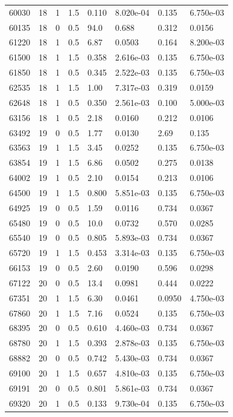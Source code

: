 \documentclass[preview]{standalone}
\begin{document}
{{{{{\begin{tabular}{L{1.2cm}C{1.2cm} C{0.3cm}C{0.5cm} C{1.4cm}C{1.4cm} C{1.4cm}C{1.4cm}}
  60030  &    18  & 1     & 1.5 &  0.110  & 8.020e-04  & 0.135 &  6.750e-03   \\ 
  60135  &    18  & 0     & 0.5 &  94.0  & 0.688  & 0.312 &  0.0156   \\ 
  61220  &    18  & 1     & 0.5 &  6.87  & 0.0503  & 0.164 &  8.200e-03   \\ 
  61500  &    18  & 1     & 1.5 &  0.358  & 2.616e-03  & 0.135 &  6.750e-03   \\ 
  61850  &    18  & 1     & 0.5 &  0.345  & 2.522e-03  & 0.135 &  6.750e-03   \\ 
  62535  &    18  & 1     & 1.5 &  1.00  & 7.317e-03  & 0.319 &  0.0159   \\ 
  62648  &    18  & 1     & 0.5 &  0.350  & 2.561e-03  & 0.100 &  5.000e-03   \\ 
  63156  &    18  & 1     & 0.5 &  2.18  & 0.0160  & 0.212 &  0.0106   \\ 
  63492  &    19  & 0     & 0.5 &  1.77  & 0.0130  & 2.69 &  0.135   \\ 
  63563  &    19  & 1     & 1.5 &  3.45  & 0.0252  & 0.135 &  6.750e-03   \\ 
  63854  &    19  & 1     & 1.5 &  6.86  & 0.0502  & 0.275 &  0.0138   \\ 
  64002  &    19  & 1     & 0.5 &  2.10  & 0.0154  & 0.213 &  0.0106   \\ 
  64500  &    19  & 1     & 1.5 &  0.800  & 5.851e-03  & 0.135 &  6.750e-03   \\ 
  64925  &    19  & 0     & 0.5 &  1.59  & 0.0116  & 0.734 &  0.0367   \\ 
  65480  &    19  & 0     & 0.5 &  10.0  & 0.0732  & 0.570 &  0.0285   \\ 
  65540  &    19  & 0     & 0.5 &  0.805  & 5.893e-03  & 0.734 &  0.0367   \\ 
  65720  &    19  & 1     & 1.5 &  0.453  & 3.314e-03  & 0.135 &  6.750e-03   \\ 
  66153  &    19  & 0     & 0.5 &  2.60  & 0.0190  & 0.596 &  0.0298   \\ 
  67122  &    20  & 0     & 0.5 &  13.4  & 0.0981  & 0.444 &  0.0222   \\ 
  67351  &    20  & 1     & 1.5 &  6.30  & 0.0461  & 0.0950 &  4.750e-03   \\ 
  67860  &    20  & 1     & 1.5 &  7.16  & 0.0524  & 0.135 &  6.750e-03   \\ 
  68395  &    20  & 0     & 0.5 &  0.610  & 4.460e-03  & 0.734 &  0.0367   \\ 
  68780  &    20  & 1     & 1.5 &  0.393  & 2.878e-03  & 0.135 &  6.750e-03   \\ 
  68882  &    20  & 0     & 0.5 &  0.742  & 5.430e-03  & 0.734 &  0.0367   \\ 
  69100  &    20  & 1     & 1.5 &  0.657  & 4.810e-03  & 0.135 &  6.750e-03   \\ 
  69191  &    20  & 0     & 0.5 &  0.801  & 5.861e-03  & 0.734 &  0.0367   \\ 
  69320  &    20  & 1     & 0.5 &  0.133  & 9.730e-04  & 0.135 &  6.750e-03   \\ 
\hline 
\end{tabular} 

}}}}}
\end{document}

